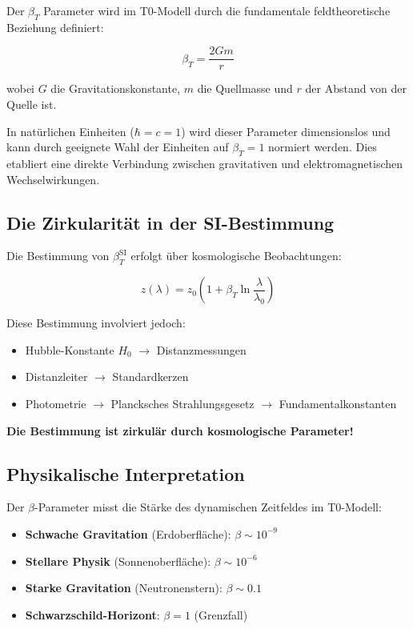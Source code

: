 Der $\beta_T$ Parameter wird im T0-Modell durch die fundamentale feldtheoretische Beziehung definiert:

\begin{equation}
	\beta_T = \frac{2Gm}{r}
	\label{eq:beta_definition}
\end{equation}

wobei $G$ die Gravitationskonstante, $m$ die Quellmasse und $r$ der Abstand von der Quelle ist.

In natürlichen Einheiten ($\hbar = c = 1$) wird dieser Parameter dimensionslos und kann durch geeignete Wahl der Einheiten auf $\beta_T = 1$ normiert werden. Dies etabliert eine direkte Verbindung zwischen gravitativen und elektromagnetischen Wechselwirkungen.

\subsection{Die Zirkularität in der SI-Bestimmung}
\label{subsec:beta_circularity}

Die Bestimmung von $\beta_T^{\text{SI}}$ erfolgt über kosmologische Beobachtungen:

\begin{equation}
	z(\lambda) = z_0\left(1 + \beta_T \ln\frac{\lambda}{\lambda_0}\right)
\end{equation}

Diese Bestimmung involviert jedoch:
\begin{itemize}
	\item Hubble-Konstante $H_0$ $\rightarrow$ Distanzmessungen
	\item Distanzleiter $\rightarrow$ Standardkerzen
	\item Photometrie $\rightarrow$ Plancksches Strahlungsgesetz $\rightarrow$ Fundamentalkonstanten
\end{itemize}

\textbf{Die Bestimmung ist zirkulär durch kosmologische Parameter!}

\subsection{Physikalische Interpretation}
\label{subsec:beta_physical}

Der $\beta$-Parameter misst die Stärke des dynamischen Zeitfeldes im T0-Modell:

\begin{itemize}
	\item \textbf{Schwache Gravitation} (Erdoberfläche): $\beta \sim 10^{-9}$
	\item \textbf{Stellare Physik} (Sonnenoberfläche): $\beta \sim 10^{-6}$
	\item \textbf{Starke Gravitation} (Neutronenstern): $\beta \sim 0.1$
	\item \textbf{Schwarzschild-Horizont}: $\beta = 1$ (Grenzfall)
\end{itemize}

